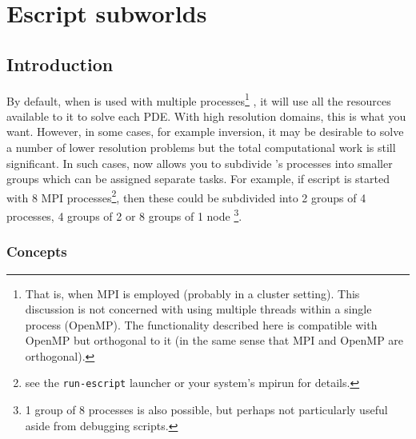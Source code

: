 
%
%
%

\chapter{Escript subworlds}
\label{CHAP:subworld}
\section{Introduction}
By default, when \escript is used with multiple processes\footnote{That is, when MPI is employed 
(probably in a cluster setting).
This discussion is not concerned with using multiple threads within a single process (OpenMP).
The functionality described here is compatible with OpenMP but orthogonal to it (in the same sense that MPI and OpenMP are
orthogonal).}
, it will use all the resources available to it to solve each PDE.
With high resolution domains, this is what you want.
However, in some cases, for example inversion, it may be desirable to solve a number of lower resolution problems but the
total computational work is still significant.
In such cases, \escript now allows you to subdivide \escript's processes into smaller groups which can be assigned separate 
tasks.
For example, if escript is started with 8 MPI processes\footnote{see the \texttt{run-escript} launcher or 
your system's mpirun for details.}, then these could be subdivided into 2 groups of 4 processes, 4 groups of 2 or 8 groups of 1 node
\footnote{1 group of 8 processes is also possible, but perhaps not particularly useful aside from debugging scripts.}.




\subsection{Concepts}

